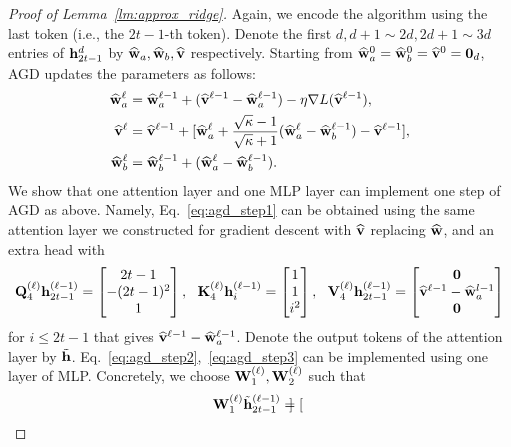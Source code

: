 \begin{proof}[Proof of Lemma~\ref{lm:approx_ridge}]
Again, we encode the algorithm using the last token (i.e., the $2t-1$-th token). 
Denote the first $d,d+1\sim 2d, 2d+1\sim3d $ entries of ${\mathbf h}_{2t-1}^{{d}}$ by $\widehat{{\mathbf w}}_a,\widehat{{\mathbf w}}_b,\widehat{{\mathbf v}}$ respectively. Starting from $\widehat{{\mathbf w}}_a^{0}=\widehat{{\mathbf w}}_b^{0}=\widehat{{\mathbf v}}^{0}={\mathbf 0}_d$,  AGD updates the parameters as follows:
\begin{subequations}
\begin{align}
    \widehat{{\mathbf w}}^\ell_a&=\widehat{{\mathbf w}}_a^{\ell-1}+(\widehat{{\mathbf v}}^{\ell-1}-\widehat{{\mathbf w}}_a^{\ell-1})-\eta \nabla L(\widehat{{\mathbf v}}^{\ell-1}),\label{eq:agd_step1}\\
    \widehat{{\mathbf v}}^{\ell}&=\widehat{{\mathbf v}}^{\ell-1}+[\widehat{{\mathbf w}}^\ell_a+\frac{\sqrt{\kappa}-1}{\sqrt{\kappa}+1}(\widehat{{\mathbf w}}^\ell_a-\widehat{{\mathbf w}}^{\ell-1}_b)-\widehat{{\mathbf v}}^{\ell-1}],\label{eq:agd_step2}\\
    \widehat{{\mathbf w}}^\ell_b&= \widehat{{\mathbf w}}^{\ell-1}_b+( \widehat{{\mathbf w}}^\ell_a-\widehat{{\mathbf w}}^{\ell-1}_b).\label{eq:agd_step3}
\end{align}
\end{subequations}
We show that one attention layer and one MLP layer can implement one step of AGD as above. Namely, Eq.~\eqref{eq:agd_step1} can be obtained using the same attention layer we constructed for gradient descent with $\widehat{{\mathbf v}}$ replacing $\widehat{{\mathbf w}}$, and an extra head with
\begin{align*}
     {\mathbf Q}_4^{(\ell)}{\mathbf h}^{(\ell-1)}_{2t-1}=\begin{bmatrix}
         2t-1\\-(2t-1)^2\\ 1
    \end{bmatrix},~~ {\mathbf K}_4^{(\ell)}{\mathbf h}^{(\ell-1)}_{i}=\begin{bmatrix}
        1\\ 1 \\i^2
    \end{bmatrix},~~ {\mathbf V}_4^{(\ell)}{\mathbf h}^{(\ell-1)}_{2t-1}=\begin{bmatrix}
        {\mathbf 0}\\ \widehat{{\mathbf v}}^{\ell-1}-\widehat{{\mathbf w}}_a^{l-1}\\ {\mathbf 0}
    \end{bmatrix}
\end{align*} for $i\leq 2t-1$ that gives $\widehat{{\mathbf v}}^{\ell-1}-\widehat{{\mathbf w}}_a^{\ell-1}$.
Denote the output tokens of the attention layer by $\tilde {{\mathbf h}}$. Eq.~\eqref{eq:agd_step2},~\eqref{eq:agd_step3} can be implemented using one layer of MLP. Concretely, we choose ${\mathbf W}_{1}^{(\ell)},{\mathbf W}_{2}^{(\ell)}$ such that
\begin{align*}
     &{\mathbf W}_1^{(\ell)}\tilde{{\mathbf h}}^{(\ell-1)}_{2t-1}=\begin{bmatrix}

\end{bmatrix}
\end{align*}
\end{proof}
